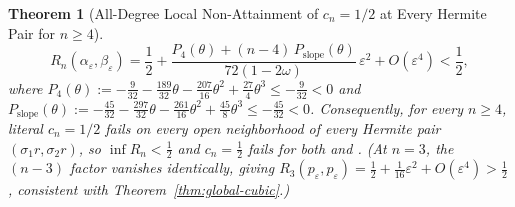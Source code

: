 \documentclass[11pt,a4paper]{article}
\newtheorem{theorem}{Theorem}[section]
\theoremstyle{definition}
\begin{document}
\begin{theorem}[All-Degree Local Non-Attainment of $c_n = 1/2$ at Every Hermite Pair for $n \ge 4$]
\begin{equation}
\label{eq:unequal-scale-nonattainment}
R_n(\alpha_\varepsilon, \beta_\varepsilon)
= \frac{1}{2} + \frac{P_4(\theta) + (n-4)\,P_{\mathrm{slope}}(\theta)}{72(1-2\omega)}\,\varepsilon^2 + O(\varepsilon^4) < \frac{1}{2},
\end{equation}
where $P_4(\theta) := -\frac{9}{32} - \frac{189}{32}\theta - \frac{207}{16}\theta^2 + \frac{27}{4}\theta^3 \le -\frac{9}{32} < 0$ and $P_{\mathrm{slope}}(\theta) := -\frac{45}{32} - \frac{297}{32}\theta - \frac{261}{16}\theta^2 + \frac{45}{8}\theta^3 \le -\frac{45}{32} < 0$. Consequently, for every $n \ge 4$, literal $c_n = 1/2$ fails on every open neighborhood of \emph{every} Hermite pair $(\sigma_1 r, \sigma_2 r)$, so $\inf R_n < \frac{1}{2}$ and $c_n = \frac{1}{2}$ fails for both \cite[eq.~(101)]{HH2026} and \cite[eq.~(100)]{HH2026}. (At $n = 3$, the $(n-3)$ factor vanishes identically, giving $R_3(p_\varepsilon, p_\varepsilon) = \frac{1}{2} + \frac{1}{16}\varepsilon^2 + O(\varepsilon^4) > \frac{1}{2}$, consistent with Theorem~\ref{thm:global-cubic}.)
\end{theorem}
\end{document}
